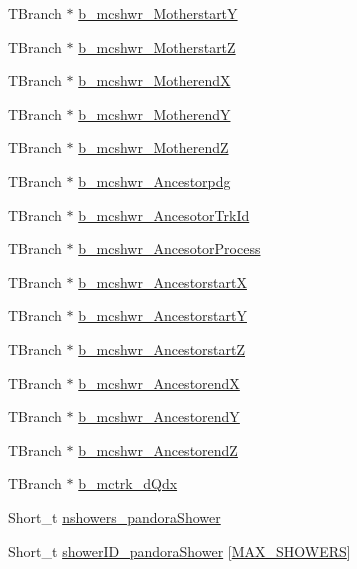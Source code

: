 \begin{DoxyCompactItemize}
\item 
T\-Branch $\ast$ \hyperlink{classanatree_a24ef95abc18682df76672770aab7e019}{b\-\_\-mcshwr\-\_\-\-Motherstart\-Y}
\item 
T\-Branch $\ast$ \hyperlink{classanatree_a07c1fc9caec1bd140ebfff47934e3c64}{b\-\_\-mcshwr\-\_\-\-Motherstart\-Z}
\item 
T\-Branch $\ast$ \hyperlink{classanatree_abe63eb085994efceda3af3ee5303ea51}{b\-\_\-mcshwr\-\_\-\-Motherend\-X}
\item 
T\-Branch $\ast$ \hyperlink{classanatree_af33fedfde6a0c48a3c88177ded8440bf}{b\-\_\-mcshwr\-\_\-\-Motherend\-Y}
\item 
T\-Branch $\ast$ \hyperlink{classanatree_ae1fa7ae0a5b57c4f995847057aeae762}{b\-\_\-mcshwr\-\_\-\-Motherend\-Z}
\item 
T\-Branch $\ast$ \hyperlink{classanatree_a2f4830eef4ad053d47da0e99f5bbeed8}{b\-\_\-mcshwr\-\_\-\-Ancestorpdg}
\item 
T\-Branch $\ast$ \hyperlink{classanatree_af10d2d609e4af74c8a9a70c53214ff3a}{b\-\_\-mcshwr\-\_\-\-Ancesotor\-Trk\-Id}
\item 
T\-Branch $\ast$ \hyperlink{classanatree_a2099cdf3b3e0a3fd61a60157ffa4c77f}{b\-\_\-mcshwr\-\_\-\-Ancesotor\-Process}
\item 
T\-Branch $\ast$ \hyperlink{classanatree_ada38024dd76ebd90010a236a77271844}{b\-\_\-mcshwr\-\_\-\-Ancestorstart\-X}
\item 
T\-Branch $\ast$ \hyperlink{classanatree_adcf3c50dba83b8bd22101ff84c4d5274}{b\-\_\-mcshwr\-\_\-\-Ancestorstart\-Y}
\item 
T\-Branch $\ast$ \hyperlink{classanatree_a7d646766ed5e4ee30aa9caa6d3336cc6}{b\-\_\-mcshwr\-\_\-\-Ancestorstart\-Z}
\item 
T\-Branch $\ast$ \hyperlink{classanatree_a1d31600d4084dbc6a2a98519518a3cc4}{b\-\_\-mcshwr\-\_\-\-Ancestorend\-X}
\item 
T\-Branch $\ast$ \hyperlink{classanatree_ae78dc647d234f376ec16593a948eaf40}{b\-\_\-mcshwr\-\_\-\-Ancestorend\-Y}
\item 
T\-Branch $\ast$ \hyperlink{classanatree_a0c83dd3cca1e34639d9f05af1eb2dd2e}{b\-\_\-mcshwr\-\_\-\-Ancestorend\-Z}
\item 
T\-Branch $\ast$ \hyperlink{classanatree_a5fc48efcb2861f419fe6928b5a6a7064}{b\-\_\-mctrk\-\_\-d\-Qdx}
\item 
Short\-\_\-t \hyperlink{classanatree_a4b3ce262f9d25883d7be36b98a8adc14}{nshowers\-\_\-pandora\-Shower}
\item 
Short\-\_\-t \hyperlink{classanatree_af27c22dad9e06954d08d5209d69ef9ff}{shower\-I\-D\-\_\-pandora\-Shower} \mbox{[}\hyperlink{anatree__core__v09410002_8h_aa8deaf72f1f7bd4b88c7d1ea07590801}{M\-A\-X\-\_\-\-S\-H\-O\-W\-E\-R\-S}\mbox{]}

\end{DoxyCompactItemize}
